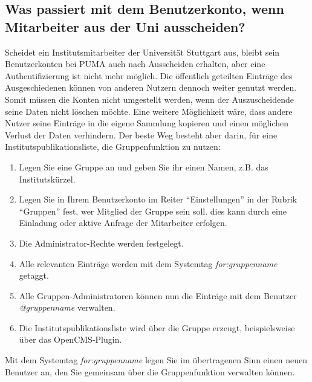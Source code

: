 \subsection{Was passiert mit dem Benutzerkonto, wenn Mitarbeiter aus der Uni ausscheiden?}
Scheidet ein Institutsmitarbeiter der Universität Stuttgart aus, bleibt sein Benutzerkonten bei PUMA auch nach Ausscheiden erhalten, aber eine Authentifizierung ist nicht mehr möglich. Die öffentlich geteilten Einträge des Ausgeschiedenen können von anderen Nutzern dennoch weiter genutzt werden.  Somit müssen die Konten nicht umgestellt werden, wenn der Auszuscheidende seine Daten nicht löschen möchte.\newline\newline
Eine weitere Möglichkeit wäre, dass andere Nutzer seine Einträge in die eigene Sammlung kopieren und einen möglichen Verlust der Daten verhindern. Der beste Weg besteht aber darin, für eine Institutspublikationsliste,
die Gruppenfunktion zu nutzen:
\begin{enumerate}
\item Legen Sie eine Gruppe an und geben Sie ihr einen Namen, z.B. das Institutskürzel.
\item Legen Sie in Ihrem Benutzerkonto im Reiter \enquote{Einstellungen} in der Rubrik \enquote{Gruppen} fest, wer Mitglied der Gruppe sein soll. dies kann durch eine Einladung oder aktive Anfrage der Mitarbeiter erfolgen. 
\item Die Administrator-Rechte werden festgelegt.
\item Alle relevanten Einträge werden mit dem Systemtag \textit{for:gruppenname} getaggt.
\item Alle Gruppen-Administratoren können nun die Einträge mit dem Benutzer
\textit{@gruppenname} verwalten.
\item Die Institutspublikationsliste wird über die Gruppe erzeugt, beispielsweise über das OpenCMS-Plugin. 
\end{enumerate}
Mit dem Systemtag \textit{for:gruppenname} legen Sie im übertragenen Sinn einen neuen Benutzer an, den Sie gemeinsam über die Gruppenfunktion verwalten können.
